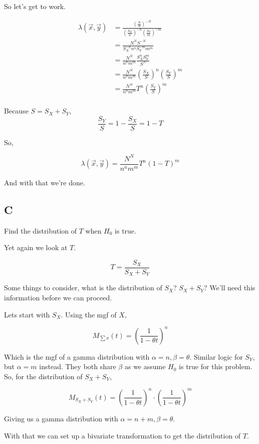 So let's get to work.

\begin{align*}
	\lambda(\vec{x}, \vec{y}) &= \frac{\left( \frac{S}{N} \right)^{-N}}{\left( \frac{S_X}{n} \right)^{-n} \left( \frac{S_Y}{m} \right)^{-m}} \\
	&= \frac{N^N S^{-N}}{S_X^{-n} n^n S_Y^{-m} m^m} \\
	&= \frac{N^N}{n^nm^m} \frac{S_X^n S_Y^m}{S^N} \\
	&=  \frac{N^N}{n^nm^m} \left( \frac{S_X}{S} \right)^n \left( \frac{S_Y}{S} \right)^m \\
	&=  \frac{N^N}{n^nm^m} T^n \left( \frac{S_Y}{S} \right)^m \\
\end{align*}

Because $S = S_X + S_Y$, 
\[\frac{S_Y}{S} = 1 - \frac{S_X}{S} = 1 - T\]

So,

\[
	\lambda(\vec{x}, \vec{y}) = \frac{N^N}{n^nm^m} T^n \left( 1-T \right)^m   
\]

And with that we're done.

\pagebreak
\subsection{C}

Find the distribution of $T$ when $H_0$ is true.

Yet again we look at $T$.

\[
	T = \frac{S_X}{S_X + S_Y}
\]

Some things to consider, what is the distribution of $S_X$? $S_X + S_Y$? We'll need this information before we can proceed. 

Lets start with $S_X$. Using the mgf of $X$, 

\[
	M_{\sum x}(t) = \left( \frac{1}{1 - \theta t} \right)^n
\]

Which is the mgf of a gamma distribution with $\alpha=n, \beta=\theta$. Similar logic for $S_Y$, but $\alpha = m$ instead. They both share $\beta$ as we assume $H_0$ is true for this problem. So, for the distribution of $S_X + S_Y$,

\[
	M_{S_X + S_Y}(t) = \left( \frac{1}{1 - \theta t} \right)^n \cdot \left( \frac{1}{1 - \theta t} \right)^m
\]

Giving us a gamma distribution with $\alpha = n+m, \beta=\theta$.

With that we can set up a bivariate transformation to get the distribution of $T$. 

